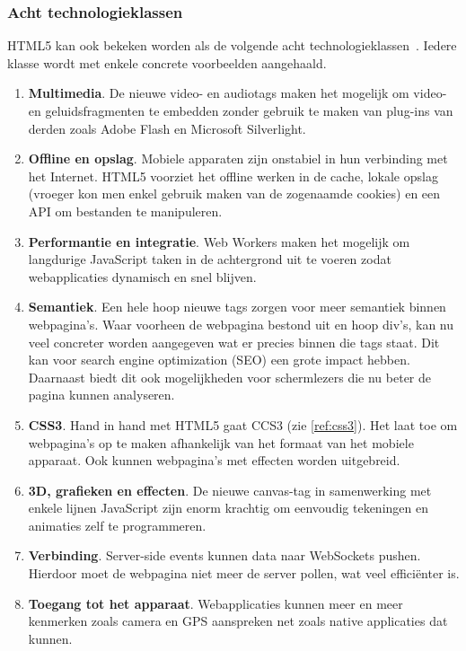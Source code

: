 \subsubsection{Acht technologieklassen}
HTML5 kan ook bekeken worden als de volgende acht technologieklassen~\cite{W3C2012}. Iedere klasse wordt met enkele concrete voorbeelden aangehaald.

\begin{enumerate}
\item \textbf{Multimedia}. De nieuwe video- en audiotags maken het mogelijk om video- en geluidsfragmenten te embedden zonder gebruik te maken van plug-ins van derden zoals Adobe Flash en Microsoft Silverlight.

\item \textbf{Offline en opslag}.  Mobiele apparaten zijn onstabiel in hun verbinding met het Internet. HTML5 voorziet het offline werken in de cache, lokale opslag (vroeger kon men enkel gebruik maken van de zogenaamde cookies) en een API om bestanden te manipuleren.

\item \textbf{Performantie en integratie}.  Web Workers maken het mogelijk om langdurige JavaScript taken in de achtergrond uit te voeren zodat webapplicaties dynamisch en snel blijven.

\item \textbf{Semantiek}.  Een hele hoop nieuwe tags zorgen voor meer semantiek binnen webpagina's. Waar voorheen de webpagina bestond uit en hoop div's, kan nu veel concreter worden aangegeven wat er precies binnen die tags staat. Dit kan voor search engine optimization (SEO) een grote impact hebben. Daarnaast biedt dit ook mogelijkheden voor schermlezers die nu beter de pagina kunnen analyseren.

\item \textbf{CSS3}.  Hand in hand met HTML5 gaat CCS3 (zie \ref{ref:css3}). Het laat toe om webpagina's op te maken afhankelijk van het formaat van het mobiele apparaat. Ook kunnen webpagina's met effecten worden uitgebreid. 

\item \textbf{3D, grafieken en effecten}.  De nieuwe canvas-tag in samenwerking met enkele lijnen JavaScript zijn enorm krachtig om eenvoudig tekeningen en animaties zelf te programmeren.

\item \textbf{Verbinding}.  Server-side events kunnen data naar WebSockets pushen. Hierdoor moet de webpagina niet meer de server pollen, wat veel efficiënter is.

\item \textbf{Toegang tot het apparaat}. Webapplicaties kunnen meer en meer kenmerken zoals camera en GPS aanspreken net zoals native applicaties dat kunnen. 
\end{enumerate}

